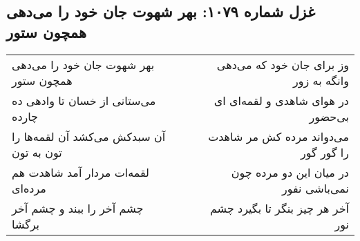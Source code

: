 \begin{center}
\section*{غزل شماره ۱۰۷۹: بهر شهوت جان خود را می‌دهی همچون ستور}
\label{sec:1079}
\begin{longtable}{l p{0.5cm} r}
بهر شهوت جان خود را می‌دهی همچون ستور
&&
وز برای جان خود که می‌دهی وانگه به زور
\\
می‌ستانی از خسان تا وادهی ده چارده
&&
در هوای شاهدی و لقمه‌ای ای بی‌حضور
\\
آن سبدکش می‌کشد آن لقمه‌ها را تون به تون
&&
می‌دواند مرده کش مر شاهدت را گور گور
\\
لقمه‌ات مردار آمد شاهدت هم مرده‌ای
&&
در میان این دو مرده چون نمی‌باشی نفور
\\
چشم آخر را ببند و چشم آخر برگشا
&&
آخر هر چیز بنگر تا بگیرد چشم نور
\\
\end{longtable}
\end{center}
